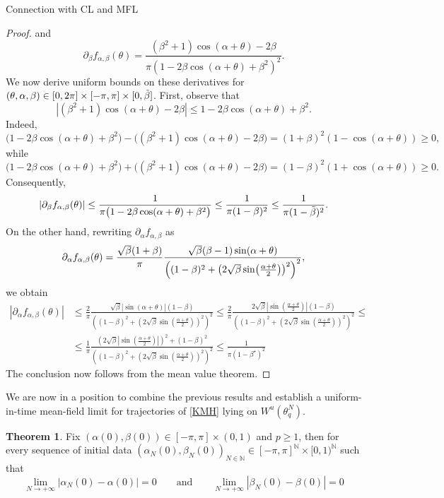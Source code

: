 \documentclass{article}
\theoremstyle{definition}
\newtheorem{theorem}[definition]{Theorem}
\newcommand{\N}{\mathbb{N}}
\begin{document}
\begin{section}{Connection with CL and MFL}
\begin{proof}
and
$$ \partial_\beta f_{\alpha,\beta}(\theta) = \frac{(\beta^2+1)\cos(\alpha+\theta)-2\beta} {\pi(1-2\beta\cos(\alpha+\theta)+\beta^2)^2}. $$
We now derive uniform bounds on these derivatives for $(\theta,\alpha,\beta)\in [0,2\pi]\times[-\pi,\pi]\times[0,\Tilde{\beta}]$. First, observe that
$$ |(\beta^2+1)\cos(\alpha+\theta)-2\beta| \leq 1-2\beta\cos(\alpha+\theta)+\beta^2. $$
Indeed,
$$ \bigl(1-2\beta\cos(\alpha+\theta)+\beta^2\bigr) -\bigl((\beta^2+1)\cos(\alpha+\theta)-2\beta\bigr) =(1+\beta)^2(1-\cos(\alpha+\theta)) \geq0, $$
while
$$ \bigl(1-2\beta\cos(\alpha+\theta)+\beta^2\bigr) +\bigl((\beta^2+1)\cos(\alpha+\theta)-2\beta\bigr) =(1-\beta)^2(1+\cos(\alpha+\theta)) \geq0. $$
Consequently,
$$ |\partial_\beta f_{\alpha,\beta}(\theta)| \leq \frac{1} {\pi\bigl(1-2\beta\cos(\alpha+\theta)+\beta^2\bigr)} \leq \frac{1}{\pi(1-\beta)^2} \leq \frac{1}{\pi(1-\Tilde{\beta})^2}. $$
On the other hand, rewriting $\partial_\alpha f_{\alpha,\beta}$ as
$$ \partial_\alpha f_{\alpha,\beta}(\theta) = \frac{\sqrt{\beta}(1+\beta)}{\pi} \frac{\sqrt{\beta}(\beta-1)\sin(\alpha+\theta)} {\Bigl((1-\beta)^2+ \bigl(2\sqrt{\beta} \sin\bigl(\frac{\alpha+\theta}{2}\bigr)\bigr)^2 \Bigr)^2}, $$
we obtain
\begin{align*}
        |\partial_\alpha f_{\alpha,\beta}(\theta)|&\leq\frac{2}{\pi}\frac{\sqrt{\beta}|\sin(\alpha+\theta)|(1-\beta)}{\left((1-\beta)^2+\left(2\sqrt{\beta}\sin\left(\frac{\alpha+\theta}{2}\right)\right)^2\right)^2}\leq\frac{2}{\pi}\frac{2\sqrt{\beta}\left|\sin\left(\frac{\alpha+\theta}{2}\right)\right|(1-\beta)}{\left((1-\beta)^2+\left(2\sqrt{\beta}\sin\left(\frac{\alpha+\theta}{2}\right)\right)^2\right)^2}\leq\\
        &\leq\frac{1}{\pi}\frac{\left(2\sqrt{\beta}\left|\sin\left(\frac{\alpha+\theta}{2}\right)\right|\right)^2+(1-\beta)^2}{\left((1-\beta)^2+\left(2\sqrt{\beta}\sin\left(\frac{\alpha+\theta}{2}\right)\right)^2\right)^2}\leq\frac{1}{\pi\left(1-\beta^\star\right)^2}
    \end{align*}
The conclusion now follows from the mean value theorem.
\end{proof}
We are now in a position to combine the previous results and establish a uniform-in-time mean-field limit for trajectories of \eqref{KMH} lying on $W^u(\theta_q^N)$.
\begin{theorem}\label{unif_MFL}
Fix $\left(\alpha(0),\beta(0)\right)\in[-\pi,\pi]\times(0,1)$ and $p\geq1$, then for every sequence of initial data $\left(\alpha_N(0),\beta_N(0)\right)_{N\in\N}\in[-\pi,\pi]^\N\times[0,1)^\N$ such that
$$\lim_{N\rightarrow+\infty}|\alpha_N(0)-\alpha(0)|=0\qquad\text{and}\qquad\lim_{N\rightarrow+\infty}|\beta_N(0)-\beta(0)|=0$$

\end{theorem}
\end{section}
\end{document}
